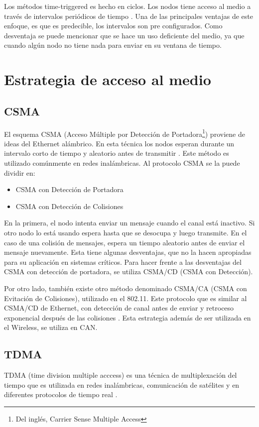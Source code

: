 Los métodos time-triggered es hecho en ciclos. Los nodos tiene acceso al medio a través de intervalos periódicos de tiempo \citep{Lisner07}. Una de las principales ventajas de este enfoque, es que es predecible, los intervalos son pre configurados. Como desventaja se puede mencionar que se hace un uso deficiente del medio, ya que cuando algún nodo no tiene nada para enviar en su ventana de tiempo.

\section{Estrategia de acceso al medio}
\subsection{CSMA}\label{subsection:CSMA}
El esquema CSMA (Acceso Múltiple por Detección de Portadora\footnote{Del inglés, Carrier Sense Multiple Access}) proviene de ideas del Ethernet alámbrico. En esta técnica los nodos esperan durante un intervalo corto de tiempo y aleatorio antes de transmitir \citep{Tanenbaum03}. Este método es utilizado comúnmente en redes inalámbricas. Al protocolo CSMA se la puede dividir en:
\begin{itemize}
 \item CSMA con Detección de Portadora
 \item CSMA con Detección de Colisiones
\end{itemize}

En la primera, el nodo intenta enviar un mensaje cuando el canal está inactivo. Si otro nodo lo está usando espera hasta que se desocupa y luego transmite. En el caso de una colisión de mensajes, espera un tiempo aleatorio antes de enviar el mensaje nuevamente. Esta tiene algunas desventajas, que no la hacen apropiadas para su aplicación en sistemas críticos. Para hacer frente a las desventajas del CSMA con detección de portadora, se utiliza CSMA/CD (CSMA con Detección).

Por otro lado, también existe otro método denominado CSMA/CA (CSMA con Evitación de Colisiones), utilizado en el 802.11. Este protocolo que es similar al CSMA/CD de Ethernet, con detección de canal antes de enviar y retroceso exponencial después de las colisiones \citep{Tanenbaum03}. Esta estrategia además de ser utilizada en el Wireless, se utiliza en CAN.

\subsection{TDMA}
TDMA (time division multiple acccess) es una técnica de multiplexación del tiempo que es utilizada en redes inalámbricas, comunicación de satélites y en diferentes protocolos de tiempo real \citep{Lisner07}.

